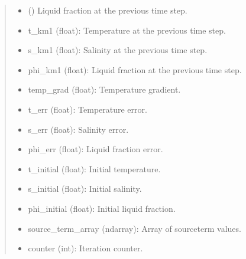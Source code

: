\documentclass[a4paper,11pt,english,openany]{sphinxmanual}
\begin{document}
\begin{fulllineitems}
\begin{fulllineitems}
\begin{quote}
\begin{description}
\begin{itemize}
\item {} 
\sphinxAtStartPar
{} () \textendash{} Liquid fraction at the previous time step.

\end{itemize}

\sphinxAtStartPar
\begin{description}
\begin{itemize}
\item {} 
\sphinxAtStartPar
t\_km1 (float): Temperature at the previous time step.

\item {} 
\sphinxAtStartPar
s\_km1 (float): Salinity at the previous time step.

\item {} 
\sphinxAtStartPar
phi\_km1 (float): Liquid fraction at the previous time step.

\item {} 
\sphinxAtStartPar
temp\_grad (float): Temperature gradient.

\item {} 
\sphinxAtStartPar
t\_err (float): Temperature error.

\item {} 
\sphinxAtStartPar
s\_err (float): Salinity error.

\item {} 
\sphinxAtStartPar
phi\_err (float): Liquid fraction error.

\item {} 
\sphinxAtStartPar
t\_initial (float): Initial temperature.

\item {} 
\sphinxAtStartPar
s\_initial (float): Initial salinity.

\item {} 
\sphinxAtStartPar
phi\_initial (float): Initial liquid fraction.

\item {} 
\sphinxAtStartPar
source\_term\_array (ndarray): Array of source\sphinxhyphen{}term values.

\item {} 
\sphinxAtStartPar
counter (int): Iteration counter.

\end{itemize}

\end{description}



\end{description}
\end{quote}
\end{fulllineitems}
\end{fulllineitems}
\end{document}

